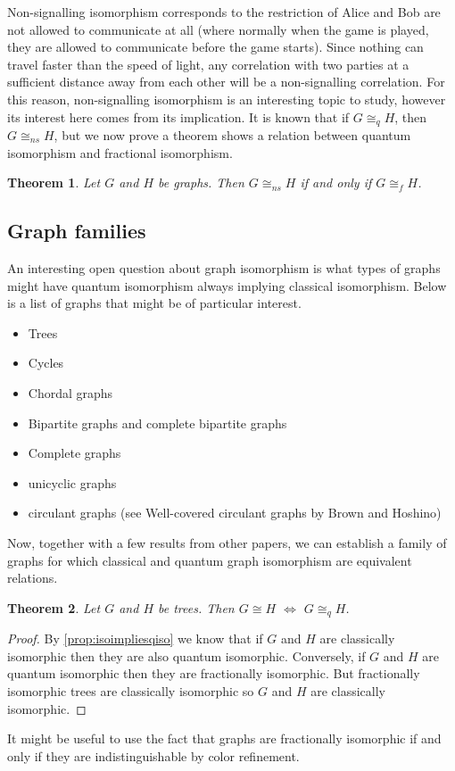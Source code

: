 \documentclass[12pt]{article}
\newtheorem{thm}{Theorem}[section]
\begin{document}
Non-signalling isomorphism corresponds to the restriction of Alice and Bob are not allowed to communicate at all (where normally when the game is played, they are allowed to communicate before the game starts). Since nothing can travel faster than the speed of light, any correlation with two parties at a sufficient distance away from each other will be a non-signalling correlation. For this reason, non-signalling isomorphism is an interesting topic to study, however its interest here comes from its implication. It is known that if $G \cong_q H$, then $G \cong_{ns}H$, but we now prove a theorem shows a relation between quantum isomorphism and fractional isomorphism.

\begin{thm}
Let $G$ and $H$ be graphs. Then $G \cong_{ns} H$ if and only if $G \cong_f H$.
\end{thm}

\subsection{Graph families}
An interesting open question about graph isomorphism is what types of graphs might have quantum isomorphism always implying classical isomorphism. Below is a list of graphs that might be of particular interest.
\begin{itemize}
\item Trees
\item Cycles
\item Chordal graphs
\item Bipartite graphs and complete bipartite graphs
\item Complete graphs 
\item unicyclic graphs
\item circulant graphs (see Well-covered circulant graphs by Brown and Hoshino)
\end{itemize}
Now, together with a few results from other papers, we can establish a family of graphs for which classical and quantum graph isomorphism are equivalent relations.

\begin{thm}
Let $G$ and $H$ be trees. Then $G \cong H$ $\Leftrightarrow$ $G \cong_q H$.
\end{thm}
\begin{proof}
By \cref{prop:isoimpliesqiso} we know that if $G$ and $H$ are classically isomorphic then they are also quantum isomorphic. Conversely, if $G$ and $H$ are quantum isomorphic then they are fractionally isomorphic. But fractionally isomorphic trees are classically isomorphic so $G$ and $H$ are classically isomorphic.
\end{proof}


It might be useful to use the fact that graphs are fractionally isomorphic if and only if they are indistinguishable by color refinement.

\newpage



\end{document}

